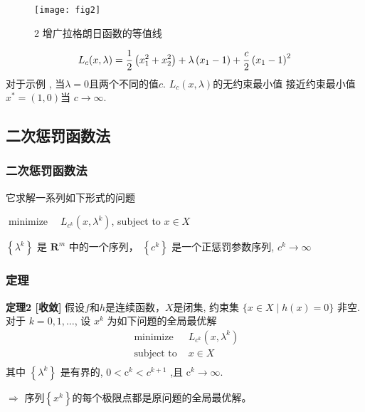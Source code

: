 \documentclass[handout,10pt]{beamer} %
\begin{document}
\begin{frame}
\begin{figure}
\texttt{[image: fig2]}
\caption{2 增广拉格朗日函数的等值线}
\end{figure}
\end{frame}

\begin{frame}
$$
L_{c}(x, \lambda)=\frac{1}{2}\left(x_{1}^{2}+x_{2}^{2}\right)+\lambda\left(x_{1}-1\right)+\frac{c}{2}\left(x_{1}-1\right)^{2}
\bigskip
$$
对于示例 , 当$\lambda=0$且两个不同的值$c .$ $L_{c}(x, \lambda)$的无约束最小值 接近约束最小值$x^{*}=(1,0)$当 $c \rightarrow \infty$.
\end{frame}



\subsection{ 二次惩罚函数法 }

\begin{frame}

\frametitle{二次惩罚函数法}

它求解一系列如下形式的问题
\begin{center}
$\operatorname{minimize} \quad L_{c^{k}}\left(x, \lambda^{k}\right)$, subject to $x \in X$
\end{center}
 $\left\{\lambda^{k}\right\}$ 是 $\mathbf{R}^{m}$ 中的一个序列， $\left\{c^{k}\right\}$ 是一个正惩罚参数序列, $c^{k}\rightarrow\infty$  
\end{frame}

\begin{frame}
\frametitle{定理}


\textbf{定理2 [收敛]} 假设$f$和$h$是连续函数，$X$是闭集, 约束集 $\{x \in X \mid h(x)=0\}$ 非空. 对于 $k=0,1, \ldots$, 设 $x^{k}$ 为如下问题的全局最优解
\begin{equation}
		\begin{array}{ll}
		\text{ minimize } & L_{c^{k}}\left(x, \lambda^{k}\right) \\
		\text { subject to } &x \in X\\		
		\end{array}
	\end{equation}
其中 $\left\{\lambda^{k}\right\}$ 是有界的, $0<\mathrm{c}^{k}<c^{k+1}$ ,且 $\mathrm{c}^{k} \rightarrow \infty$.

$\Rightarrow$  序列$\left\{x^{k}\right\}$的每个极限点都是原问题的全局最优解。
\end{frame}
\end{document}
